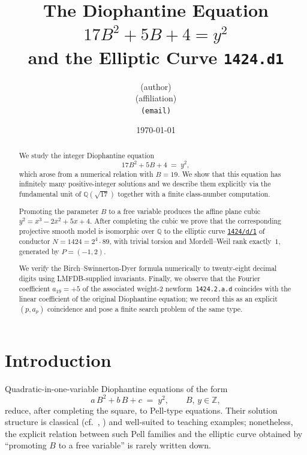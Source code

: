 \documentclass[11pt,a4paper]{article}
\title{The Diophantine Equation \boldmath$17B^2+5B+4=y^2$\unboldmath\\
       and the Elliptic Curve \texttt{1424.d1}}
\author{(author)\\\small (affiliation)\\\small \texttt{(email)}}
\date{\today}
\theoremstyle{plain}
\theoremstyle{definition}
\newcommand{\Q}{\mathbb{Q}}
\newcommand{\Z}{\mathbb{Z}}
\newcommand{\LMFDB}[1]{\href{https://www.lmfdb.org/EllipticCurve/Q/#1}{\texttt{#1}}}
\begin{document}
\maketitle

\begin{abstract}
We study the integer Diophantine equation
\begin{equation*}
  17 B^2 + 5 B + 4 \;=\; y^2 ,
\end{equation*}
which arose from a numerical relation with $B = 19$. We show that this
equation has infinitely many positive-integer solutions and we describe
them explicitly via the fundamental unit of $\Q(\sqrt{17})$ together
with a finite class-number computation.

Promoting the parameter $B$ to a free variable produces the affine
plane cubic
$y^2 = x^3 - 2x^2 + 5x + 4$.
After completing the cubic we prove that the corresponding projective
smooth model is isomorphic over $\Q$ to the elliptic curve
\LMFDB{1424/d/1} of conductor $N = 1424 = 2^4 \cdot 89$, with
trivial torsion and Mordell--Weil rank exactly~$1$, generated by
$P = (-1,2)$.

We verify the Birch--Swinnerton-Dyer formula numerically to twenty-eight
decimal digits using LMFDB-supplied invariants. Finally, we observe
that the Fourier coefficient $a_{19} = +5$ of the associated weight-2
newform~\texttt{1424.2.a.d} coincides with the linear coefficient of
the original Diophantine equation; we record this as an explicit
$(p,a_p)$ coincidence and pose a finite search problem of the same
type.
\end{abstract}

\section{Introduction}
\label{sec:intro}

Quadratic-in-one-variable Diophantine equations of the form
\begin{equation}
  \label{eq:gen-quadratic}
  a \, B^{2} + b \, B + c \;=\; y^{2},
  \qquad B,\,y \in \Z,
\end{equation}
reduce, after completing the square, to Pell-type equations. Their
solution structure is classical (cf.\ \cite{Mollin1996}, \cite{Cohen2007GTM239})
and well-suited to teaching examples; nonetheless, the explicit relation
between such Pell families and the elliptic curve obtained by
``promoting $B$ to a free variable'' is rarely written down.
\end{document}

